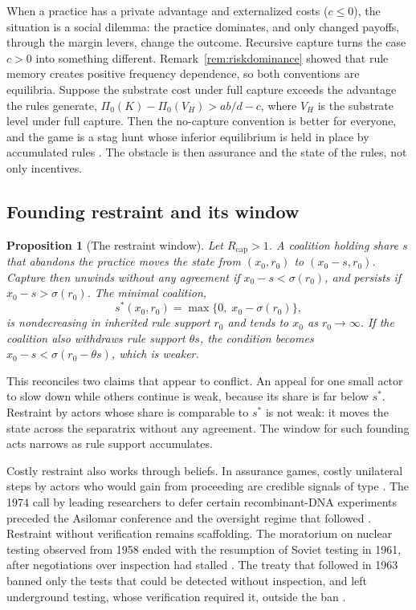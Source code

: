 \documentclass[11pt]{article}
\theoremstyle{plain}
\newtheorem{proposition}{Proposition}
\theoremstyle{definition}
\newcommand{\Rcap}{R_{\mathrm{cap}}}
\begin{document}
When a practice has a private advantage and externalized costs ($c\le0$), the situation is a social dilemma: the practice dominates, and only changed payoffs, through the margin levers, change the outcome. Recursive capture turns the case $c>0$ into something different. Remark~\ref{rem:riskdominance} showed that rule memory creates positive frequency dependence, so both conventions are equilibria. Suppose the substrate cost under full capture exceeds the advantage the rules generate, $\Pi_0(K)-\Pi_0(V_H)>ab/d-c$, where $V_H$ is the substrate level under full capture. Then the no-capture convention is better for everyone, and the game is a stag hunt whose inferior equilibrium is held in place by accumulated rules \citep{skyrms2004}. The obstacle is then assurance and the state of the rules, not only incentives.

\subsection{Founding restraint and its window}

\begin{proposition}[The restraint window]\label{prop:restraint}
Let $\Rcap>1$. A coalition holding share $s$ that abandons the practice moves the state from $(x_0,r_0)$ to $(x_0-s,r_0)$. Capture then unwinds without any agreement if $x_0-s<\sigma(r_0)$, and persists if $x_0-s>\sigma(r_0)$. The minimal coalition,
\[
s^\ast(x_0,r_0)=\max\{0,\;x_0-\sigma(r_0)\},
\]
is nondecreasing in inherited rule support $r_0$ and tends to $x_0$ as $r_0\to\infty$. If the coalition also withdraws rule support $\theta s$, the condition becomes $x_0-s<\sigma(r_0-\theta s)$, which is weaker.
\end{proposition}

This reconciles two claims that appear to conflict. An appeal for one small actor to slow down while others continue is weak, because its share is far below $s^\ast$. Restraint by actors whose share is comparable to $s^\ast$ is not weak: it moves the state across the separatrix without any agreement. The window for such founding acts narrows as rule support accumulates.

Costly restraint also works through beliefs. In assurance games, costly unilateral steps by actors who would gain from proceeding are credible signals of type \citep{kydd2000}. The 1974 call by leading researchers to defer certain recombinant-DNA experiments preceded the Asilomar conference and the oversight regime that followed \citep{berg1974,berg1975}. Restraint without verification remains scaffolding. The moratorium on nuclear testing observed from 1958 ended with the resumption of Soviet testing in 1961, after negotiations over inspection had stalled \citep{divine1978}. The treaty that followed in 1963 banned only the tests that could be detected without inspection, and left underground testing, whose verification required it, outside the ban \citep{seaborg1981}.
\end{document}
